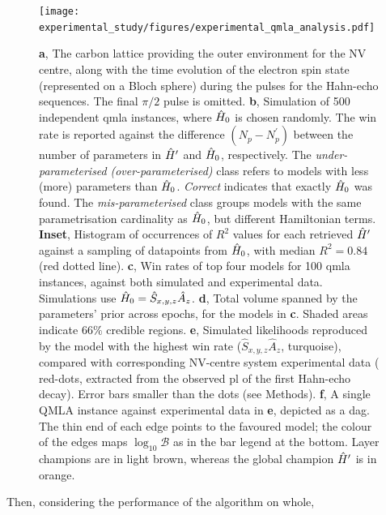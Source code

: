 \begin{figure}
    \texttt{[image: experimental\_study/figures/experimental\_qmla\_analysis.pdf]}
    \caption[\gls{qmla} applied to experimental  system]{
        \textbf{a}, 
        The carbon lattice providing the outer environment for the NV centre, along with the
        time evolution of the electron spin state (represented on a Bloch sphere) during the pulses for the Hahn-echo sequences. The final $\pi/2$ pulse is omitted.  
        \textbf{b}, 
        Simulation of 500 independent \gls{qmla} instances, where $\hat{H}_0$ is chosen randomly. 
        The  \gls{win rate}  is reported against the difference $(N_{p}-N^{\prime}_p)$ between the 
        number of parameters in $\hat{H}^{\prime}$ and $\hat{H}_0$, respectively. 
        The \emph{under-parameterised} \emph{ (over-parameterised)} class refers to models with less (more) 
        parameters than $\hat{H}_0$. 
        \emph{Correct} indicates that exactly $\hat{H}_0$ was found. 
        The \emph{mis-parameterised} class groups models with the same parametrisation cardinality as $\hat{H}_0$, but different Hamiltonian terms. 
        \textbf{Inset}, Histogram of occurrences of $R^2$ values for each retrieved $\hat{H}^{\prime}$ 
        against a sampling of datapoints from $\hat{H}_0$, with median $R^2=0.84$ (red dotted line). 
        \textbf{c}, 
        Win rates of top four models for 100 \gls{qmla} instances, 
        against both simulated and experimental data. 
        Simulations use $\hat{H}_0 = \hat{S}_{x,y,z}\hat{A}_{z}$.
        \textbf{d}, 
        Total \gls{volume} spanned by the parameters' prior across epochs, for the models in \textbf{c}. 
        Shaded areas indicate $66\%$ credible regions. 
        \textbf{e}, 
        Simulated \glspl{likelihood}  reproduced by the model with the highest  \gls{win rate}  ($\hat{S}_{x,y,z}\hat{A}_{z}$, turquoise), 
            compared with corresponding NV-centre system experimental data (
                red-dots, extracted from the observed \gls{pl} of the first Hahn-echo decay). 
        Error bars smaller than the dots (see Methods).
        \textbf{f}, 
        A single QMLA \gls{instance} against experimental data in \textbf{e}, depicted as a \gls{dag}.
        The thin end of each edge points to the favoured model; 
        the colour of the edges maps $\log_{10}\mathcal{B}$ as in the bar legend at the bottom. 
        Layer champions \huc are in light brown, whereas the global champion $\hat{H}^{\prime}$  is in orange.    
    }
    \label{fig:exp_qmla_analysis}
\end{figure}
Then, considering the performance of the algorithm on whole, 
